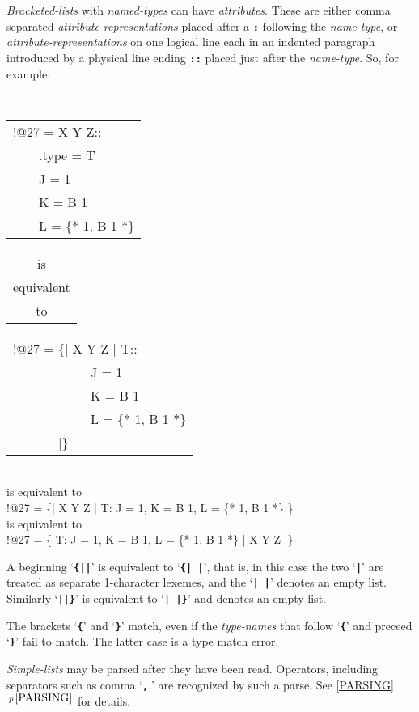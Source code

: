 \documentclass[12pt]{article}
\newcommand{\TT}[1]{{\tt \bfseries #1}}
\newcommand{\itemref}[1]{\ref{#1}$\,^{p\,\pageref{#1}}$}
\begin{document}
{\em Bracketed-lists} with {\em named-types} can have {\em attributes}.
These are either comma separated {\em attribute-representations}
placed after a \TT{:} following the {\em name-type}, or
{\em attribute-representations} on one logical line each in an indented
paragraph introduced by a physical line ending \TT{::} placed just
after the {\em name-type}.  So, for example:
\begin{center}
\tt
\begin{tabular}{l}
!@27 = X Y Z:: \\
~~~~.type = T \\
~~~~J = 1 \\
~~~~K = B 1 \\
~~~~L = \{* 1, B 1 *\} \\
\end{tabular}
\begin{tabular}{c}
\rm is \\
\rm equivalent \\
\rm to
\end{tabular}
\begin{tabular}{l}
!@27 = \{| X Y Z | T:: \\
~~~~~~~~~~~~J = 1 \\
~~~~~~~~~~~~K = B 1 \\
~~~~~~~~~~~~L = \{* 1, B 1 *\} \\
~~~~~~~|\} \\
\end{tabular}
\\[1ex]
{\rm is equivalent to}
\\[1ex]
!@27 = \{| X Y Z | T: J = 1, K = B 1, L = \{* 1, B 1 *\} \}
\\[1ex]
{\rm is equivalent to}
\\[1ex]
!@27 = \{ T: J = 1, K = B 1, L = \{* 1, B 1 *\} | X Y Z |\}
\end{center}


A beginning `\TT{\{||}' is equivalent to `\TT{\{|~|}', that is, in this
case the two `\TT{|}' are treated as separate 1-character lexemes, and
the `\TT{|~|}' denotes an empty list.  Similarly `\TT{||\}}' is
equivalent to `\TT{|~|\}}' and denotes an empty list.

The brackets `\TT{\{}' and `\TT{\}}' match, even if the {\em type-names}
that follow `\TT{\{}' and preceed `\TT{\}}' fail to match.
The latter case is a type match error.

{\em Simple-lists} may be parsed after they have been read.
Operators, including
separators such as comma `\TT{,},' are recognized by such a parse.  See
\itemref{PARSING} for details.
\end{document}
